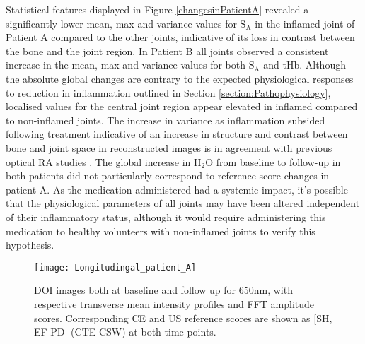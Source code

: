 \documentclass[twoside]{bhamthesis}
\theoremstyle{definition}
\begin{document}
Statistical features displayed in Figure \ref{changesinPatientA} revealed a significantly lower mean, max and variance values for $\mathrm{S_A}$ in the inflamed joint of Patient A compared to the other joints, indicative of its loss in contrast between the bone and the joint region. In Patient B all joints observed a consistent increase in the mean, max and variance values for both $\mathrm{S_A}$ and tHb. Although the absolute global changes are contrary to the expected physiological responses to reduction in inflammation outlined in Section 
\ref{section:Pathophysiology}, localised values for the central joint region appear elevated in inflamed compared to non-inflamed joints. The increase in variance as inflammation subsided following treatment indicative of an increase in structure and contrast between bone and joint space in reconstructed images is in agreement with previous optical RA studies \cite{montejo2013computer,yuan2010image}. The global increase in $\mathrm{H_2O}$ from baseline to follow-up in both patients did not particularly correspond to reference score changes in patient A. As the medication administered had a systemic impact, it's possible that the physiological parameters of all joints may have been altered independent of their inflammatory status, although it would require administering this medication to healthy volunteers with non-inflamed joints to verify this hypothesis.

\begin{figure}[!ht]
\centering\texttt{[image: Longitudingal\_patient\_A]}\caption{DOI images both at baseline and follow up for 650nm, with respective transverse mean intensity profiles and FFT amplitude scores. Corresponding CE and US reference scores are shown as [SH, EF PD] (CTE CSW) at both time points.}
\label{Longitudingal_patient_A}
\end{figure}
\end{document}
